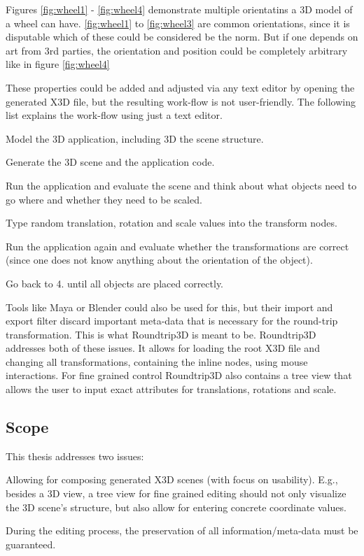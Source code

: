 Figures \ref{fig:wheel1} - \ref{fig:wheel4} demonstrate multiple orientatins a \gls{3D} model of a wheel can have. \ref{fig:wheel1} to \ref{fig:wheel3} are common
orientations, since it is disputable which of these could be considered be the
norm. But if one depends on art from 3rd parties, the orientation and position
could be completely arbitrary like in figure \ref{fig:wheel4}

These properties could be added and adjusted via any text editor by opening the
generated \gls{X3D} file, but the resulting work-flow is not user-friendly. The
following list explains the work-flow using just a text editor.

\begin{enumerate*}
  \item Model the \gls{3D} application, including \gls{3D} the scene structure.
  \item Generate the \gls{3D} scene and the application code.
  \item Run the application and evaluate the scene and think about what objects need to go where and whether they need to be scaled.
  \item Type random translation, rotation and scale values into the transform nodes.
  \item Run the application again and evaluate whether the transformations are correct (since one does not know anything about the orientation of the object).
  \item Go back to 4. until all objects are placed correctly.
\end{enumerate*}

Tools like Maya or Blender could also be used for this, but their import
and export filter discard important meta-data that is necessary for the
round-trip transformation. This is what \gls{Roundtrip3D} is meant to be. \gls{Roundtrip3D} addresses both of these issues. It allows for loading the root \gls{X3D} file and changing all transformations, containing the inline nodes,
using mouse interactions. For fine grained control \gls{Roundtrip3D} also
contains a tree view that allows the user to input exact attributes for
translations, rotations and scale.

\subsection{Scope}\label{scope}

This thesis addresses two issues:

\begin{enumerate*}
  \item Allowing for composing generated \gls{X3D} scenes (with focus on usability). E.g., besides a \gls{3D} view, a tree view for fine grained editing should not only visualize the \gls{3D} scene's structure, but also allow for entering concrete coordinate values.
  \item During the editing process, the preservation of all information/meta-data must be guaranteed.
\end{enumerate*}

